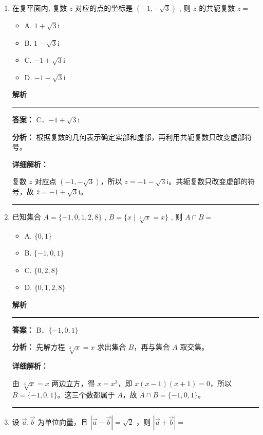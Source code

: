 \documentclass[UTF8,12pt,a4paper]{ctexart}
\renewcommand{\labelenumi}{\arabic{enumi}.}
\newenvironment{examSolutionBox}{%
  \par\medskip\begingroup
  \setlength{\leftskip}{1.0em}\setlength{\rightskip}{0.9em}%
  \noindent\textcolor{SolutionTeal}{\bfseries\large 解析}\par
  \smallskip\noindent\textcolor{SolutionRule}{\rule{\dimexpr\linewidth-\leftskip-\rightskip\relax}{0.8pt}}\par
  \smallskip\color{SolutionInk}%
}{%
  \par\smallskip\noindent\textcolor{SolutionRule}{\rule{\dimexpr\linewidth-\leftskip-\rightskip\relax}{0.8pt}}\par
  \endgroup\medskip
}
\providecommand{\tightlist}{%
  \setlength{\itemsep}{0pt}\setlength{\parskip}{0pt}}
\begin{document}
\begin{enumerate}
\def\labelenumi{\arabic{enumi}.}
\item
  在复平面内, 复数 \(z\) 对应的点的坐标是 \((-1, -\sqrt{3})\) , 则 \(z\) 的共轭复数 \(z =\)

  \begin{itemize}
  \tightlist
  \item
    A. \(1 + \sqrt{3}\mathrm{i}\)
  \item
    B. \(1 - \sqrt{3}\mathrm{i}\)
  \item
    C. \(-1 + \sqrt{3}\mathrm{i}\)
  \item
    D. \(-1 - \sqrt{3}\mathrm{i}\)
  \end{itemize}

  \begin{examSolutionBox}

  \textbf{答案：} C．\(-1+\sqrt{3}\mathrm{i}\)

  \textbf{分析：} 根据复数的几何表示确定实部和虚部，再利用共轭复数只改变虚部符号。

  \textbf{详细解析：}

  复数 \(z\) 对应点 \((-1,-\sqrt3)\)，所以 \(z=-1-\sqrt3\mathrm{i}\)。共轭复数只改变虚部的符号，故 \(\overline z=-1+\sqrt3\mathrm{i}\)。

  \end{examSolutionBox}
\item
  已知集合 \(A = \{-1, 0, 1, 2, 8\}\) , \(B = \{x \mid \sqrt[3]{x} = x\}\) , 则 \(A \cap B =\)

  \begin{itemize}
  \tightlist
  \item
    A. \(\{0, 1\}\)
  \item
    B. \(\{-1, 0, 1\}\)
  \item
    C. \(\{0, 2, 8\}\)
  \item
    D. \(\{0, 1, 2, 8\}\)
  \end{itemize}

  \begin{examSolutionBox}

  \textbf{答案：} B．\(\{-1,0,1\}\)

  \textbf{分析：} 先解方程 \(\sqrt[3]{x}=x\) 求出集合 \(B\)，再与集合 \(A\) 取交集。

  \textbf{详细解析：}

  由 \(\sqrt[3]{x}=x\) 两边立方，得 \(x=x^3\)，即 \(x(x-1)(x+1)=0\)，所以 \(B=\{-1,0,1\}\)。这三个数都属于 \(A\)，故 \(A\cap B=\{-1,0,1\}\)。

  \end{examSolutionBox}
\item
  设 \(\vec{a}, \vec{b}\) 为单位向量，且 \(|\vec{a} - \vec{b}| = \sqrt{2}\) ，则 \(|\vec{a} + \vec{b}| =\)


\end{enumerate}
\end{document}
